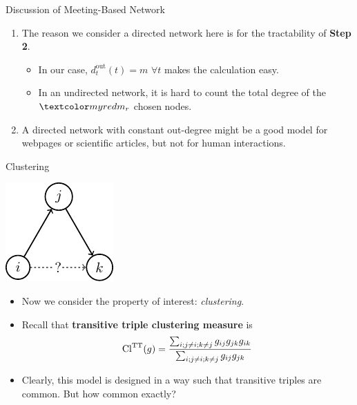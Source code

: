 \documentclass{beamer}
\begin{document}
\begin{frame}{Discussion of Meeting-Based Network}
	\begin{enumerate}
		\item
			The reason we consider a directed network here is for the tractability of \textbf{Step 2}.
			\begin{itemize}
				\item
					In our case, $d_{t}^{\text{out}}(t)=m$ $\forall t$ makes the calculation easy.
				\item
					In an undirected network,
					it is hard to count the total degree of the $\red{m_{r}}$ chosen nodes.
			\end{itemize}
		\item
			A directed network with constant out-degree might be a good model for webpages or scientific articles,
			but not for human interactions.
	\end{enumerate}
\end{frame}

\begin{frame}{Clustering}
	\begin{center}
		\includegraphics[scale=1]{figures-tikz/transitive.pdf}
	\end{center}
	\begin{itemize}
		\item
			Now we consider the property of interest: \emph{clustering}.
		\item
			Recall that \textbf{transitive triple clustering measure} is
			\begin{align*}
				\text{Cl}^{\text{TT}}(g) = \frac{\sum_{i;j\neq i;k\neq j}g_{ij}g_{jk}g_{ik}}{\sum_{i;j\neq i;k\neq j}g_{ij}g_{jk}}
			\end{align*}
		\item
			Clearly,
			this model is designed in a way such that transitive triples are common.
			But how common exactly?
	\end{itemize}
\end{frame}
\end{document}
